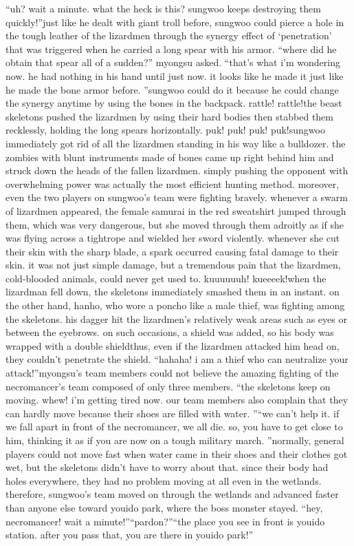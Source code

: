 “uh? wait a minute.
 what the heck is this? sungwoo keeps destroying them quickly!”just like he dealt with giant troll before, sungwoo could pierce a hole in the tough leather of the lizardmen through the synergy effect of ‘penetration’ that was triggered when he carried a long spear with his armor.
“where did he obtain that spear all of a sudden?” myongsu asked.
“that’s what i’m wondering now.
 he had nothing in his hand until just now.
 it looks like he made it just like he made the bone armor before.
”sungwoo could do it because he could change the synergy anytime by using the bones in the backpack.
rattle! rattle!the beast skeletons pushed the lizardmen by using their hard bodies then stabbed them recklessly, holding the long spears horizontally.
puk! puk! puk! puk!sungwoo immediately got rid of all the lizardmen standing in his way like a bulldozer.
the zombies with blunt instruments made of bones came up right behind him and struck down the heads of the fallen lizardmen.
simply pushing the opponent with overwhelming power was actually the most efficient hunting method.
 moreover, even the two players on sungwoo’s team were fighting bravely.
whenever a swarm of lizardmen appeared, the female samurai in the red sweatshirt jumped through them, which was very dangerous, but she moved through them adroitly as if she was flying across a tightrope and wielded her sword violently.
whenever she cut their skin with the sharp blade, a spark occurred causing fatal damage to their skin.
 it was not just simple damage, but a tremendous pain that the lizardmen, cold-blooded animals, could never get used to.
kuuuuuuh! kueeeek!when the lizardman fell down, the skeletons immediately smashed them in an instant.
on the other hand, hanho, who wore a poncho like a male thief, was fighting among the skeletons.
his dagger hit the lizardmen’s relatively weak areas such as eyes or between the eyebrows.
on such occasions, a shield was added, so his body was wrapped with a double shieldthus, even if the lizardmen attacked him head on, they couldn’t penetrate the shield.
“hahaha! i am a thief who can neutralize your attack!”myongsu’s team members could not believe the amazing fighting of the necromancer’s team composed of only three members.
“the skeletons keep on moving.
 whew! i’m getting tired now.
 our team members also complain that they can hardly move because their shoes are filled with water.
”“we can’t help it.
 if we fall apart in front of the necromancer, we all die.
 so, you have to get close to him, thinking it as if you are now on a tough military march.
”normally, general players could not move fast when water came in their shoes and their clothes got wet, but the skeletons didn’t have to worry about that.
 since their body had holes everywhere, they had no problem moving at all even in the wetlands.
therefore, sungwoo’s team moved on through the wetlands and advanced faster than anyone else toward youido park, where the boss monster stayed.
“hey, necromancer! wait a minute!”“pardon?”“the place you see in front is youido station.
 after you pass that, you are there in youido park!”

